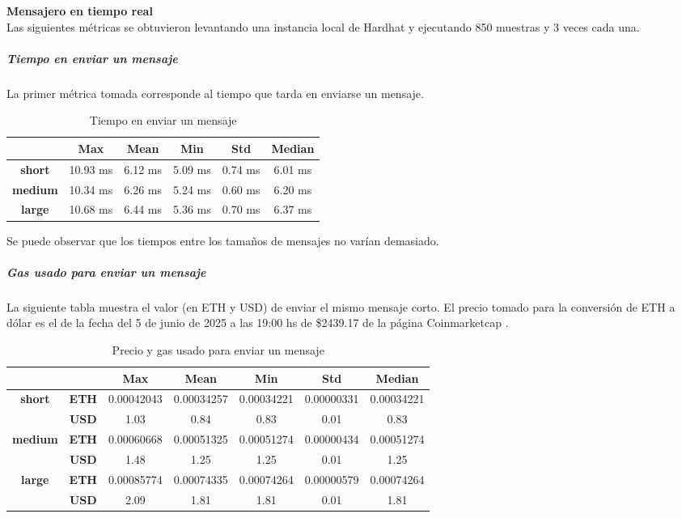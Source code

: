 \textbf{Mensajero en tiempo real}\\

Las siguientes métricas se obtuvieron levantando una instancia local de Hardhat \cite{hardhat} y ejecutando 850 muestras y 3 veces cada una.

\subparagraph{Tiempo en enviar un mensaje}

La primer métrica tomada corresponde al tiempo que tarda en enviarse un mensaje.

\setlength\tabcolsep{10pt}
\begin{table}[!htbp]
    \centering
    \begin{tabular}{|c|c|c|c|c|c|}
    \hline
    & \textbf{Max} & \textbf{Mean} & \textbf{Min} & \textbf{Std} & \textbf{Median} \\
    \hline
    \textbf{short} & 10.93 ms & 6.12 ms & 5.09 ms & 0.74 ms & 6.01 ms \\
    \hline
    \textbf{medium} & 10.34 ms & 6.26 ms & 5.24 ms & 0.60 ms & 6.20 ms \\
    \hline
    \textbf{large} & 10.68 ms & 6.44 ms & 5.36 ms & 0.70 ms & 6.37 ms \\
    \hline
    \end{tabular}
    \caption{Tiempo en enviar un mensaje}
\end{table}

Se puede observar que los tiempos entre los tamaños de mensajes no varían demasiado.

\subparagraph{Gas usado para enviar un mensaje}

La siguiente tabla muestra el valor (en ETH y USD) de enviar el mismo mensaje corto. El precio tomado para la conversión de ETH a dólar es el de la fecha del 5 de junio de 2025 a las 19:00 hs de \$2439.17 de la página Coinmarketcap \cite{coinmarketcap-eth-price}.

\setlength\tabcolsep{10pt}
\begin{table}[H]
    \centering
    \begin{tabular}{|c|c|c|c|c|c|c|}
    \hline
    & & \textbf{Max} & \textbf{Mean} & \textbf{Min} & \textbf{Std} & \textbf{Median} \\
    \hline
    \multirow{2}{*}{\textbf{short}} & \textbf{ETH} & 0.00042043 & 0.00034257 & 0.00034221 & 0.00000331 & 0.00034221 \\
    \cline{2-7}
    & \textbf{USD} & 1.03 & 0.84 & 0.83 & 0.01 & 0.83 \\
    \hline
    \multirow{2}{*}{\textbf{medium}} & \textbf{ETH} & 0.00060668 & 0.00051325 & 0.00051274 & 0.00000434 & 0.00051274 \\
    \cline{2-7}
    & \textbf{USD} & 1.48 & 1.25 & 1.25 & 0.01 & 1.25 \\
    \hline
    \multirow{2}{*}{\textbf{large}} & \textbf{ETH} & 0.00085774 & 0.00074335 & 0.00074264 & 0.00000579 & 0.00074264 \\
    \cline{2-7}
    & \textbf{USD} & 2.09 & 1.81 & 1.81 & 0.01 & 1.81 \\
    \hline
    \end{tabular}
    \caption{Precio y gas usado para enviar un mensaje}
\end{table}

